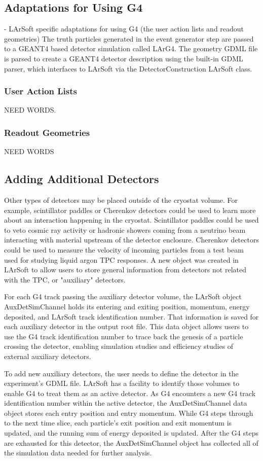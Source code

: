 \documentclass[12pt]{elsarticle}
\begin{document}
\subsection{Adaptations for Using G4}
- LArSoft specific adaptations for using G4 (the user action lists and readout geometries)
The truth particles generated in the event generator step are passed to a GEANT4 based detector simulation called LArG4.  The geometry GDML file is parsed to create a GEANT4 detector description using the built-in GDML parser, which interfaces to LArSoft via the DetectorConstruction LArSoft class.
\subsubsection{User Action Lists}
NEED WORDS.
\subsubsection{Readout Geometries}
NEED WORDS
\subsection{Adding Additional Detectors}
Other types of detectors may be placed outside of the cryostat volume.
For example, scintillator paddles or Cherenkov detectors could be used to learn more about an interaction happening in the cryostat.
Scintillator paddles could be used to veto cosmic ray activity or hadronic showers coming from a neutrino beam interacting with material upstream of the detector enclosure.
Cherenkov detectors could be used to measure the velocity of incoming particles from a test beam used for studying liquid argon TPC responses.
A new object was created in LArSoft to allow users to store general information from detectors not related with the TPC, or "auxiliary" detectors.

For each G4 track passing the auxiliary detector volume, the LArSoft object AuxDetSimChannel holds its entering and exiting position, momentum, energy deposited, and LArSoft track identification number.
That information is saved for each auxiliary detector in the output root file.
This data object allows users to use the G4 track identification number to trace back the genesis of a particle crossing the detector, enabling simulation studies and efficiency studies of external auxiliary detectors.

To add new auxiliary detectors, the user needs to define the detector in the experiment's GDML file.
LArSoft has a facility to identify those volumes to enable G4 to treat them as an active detector.
As G4 encounters a new G4 track identification number within the active detector, the AuxDetSimChannel data object stores each entry position and entry momentum.
While G4 steps through to the next time slice, each particle's exit position and exit momentum is updated, and the running sum of energy deposited is updated. 
After the G4 steps are exhausted for this detector, the AuxDetSimChannel object has collected all of the simulation data needed for further analysis.
\end{document}
